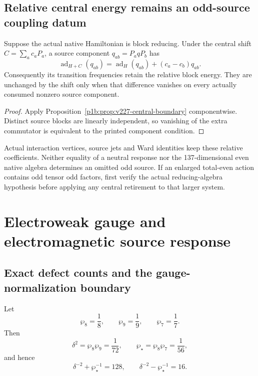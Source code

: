 \documentclass[12pt,a4paper]{article}
\begin{document}
\subsection{Relative central energy remains an odd-source coupling datum}
\label{p5c:sec:v227-odd-offset}
\begin{proposition}
\label{p5c:prop:v227-odd-offset}
Suppose the actual native Hamiltonian is block reducing. Under the central
shift $C=\sum_ac_aP_a$, a source component $q_{ab}=P_aqP_b$ has
\[
 \operatorname{ad}_{H+C}(q_{ab})
 =\operatorname{ad}_{H}(q_{ab})+(c_a-c_b)q_{ab}.
\]
Consequently its transition frequencies retain the relative block energy.
They are unchanged by the shift only when that difference vanishes on
every actually consumed nonzero source component.
\end{proposition}
\begin{proof}
Apply Proposition~\ref{p1b:prop:v227-central-boundary} componentwise.
Distinct source blocks are linearly independent, so vanishing of the
extra commutator is equivalent to the printed component condition.
\end{proof}
Actual interaction vertices, source jets and Ward identities keep these
relative coefficients. Neither equality of a neutral response nor the
137-dimensional even native algebra determines an omitted odd source.
If an enlarged total-even action contains odd tensor odd factors, first
verify the actual reducing-algebra hypothesis before applying any central
retirement to that larger system.




\section{Electroweak gauge and electromagnetic source response}
\label{p5c:sec:organized-ewem}
\subsection{Exact defect counts and the gauge-normalization boundary}
\label{p7v2:sec:gauge-normalization}

\begin{lemma}
\label{p7v2:lem:defect-counts}
Let
\[
 \wp_8=\frac18,\qquad \wp_9=\frac19,\qquad \wp_7=\frac17.
\]
Then
\begin{equation}
\label{p7v2:eq:defect-counts}
 \delta^2=\wp_8\wp_9=\frac1{72},
 \qquad
 \wp_\star=\wp_8\wp_7=\frac1{56},
\end{equation}
and hence
\begin{equation}
\label{p7v2:eq:defect-sum-difference}
 \delta^{-2}+\wp_\star^{-1}=128,
 \qquad
 \delta^{-2}-\wp_\star^{-1}=16.
\end{equation}
\end{lemma}
\end{document}

